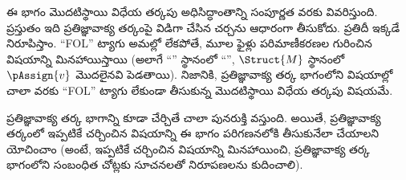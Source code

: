 \documentclass[../../include/open-logic-part]{subfiles}
\begin{document}

\begin{editorial}
  ఈ భాగం మొదటిస్థాయి విధేయ తర్కపు అధిసిద్ధాంతాన్ని సంపూర్ణత వరకు
  వివరిస్తుంది. ప్రస్తుతం ఇది ప్రతిజ్ఞావాక్య తర్కంపై విడిగా చేసిన చర్చను
  ఆధారంగా తీసుకోదు. ప్రతిదీ ఇక్కడే నిరూపిస్తాం. ``FOL'' ట్యాగు
  అమల్లో లేకపోతే, మూల ఫైళ్లు పరిమాణీకరణల గురించిన విషయాన్ని
  మినహాయిస్తాయి (అలాగే ``'' స్థానంలో
  ``'', $\Struct{M}$ స్థానంలో~$\pAssign{v}$ మొదలైనవి
  పెడతాయి). నిజానికి, ప్రతిజ్ఞావాక్య తర్క భాగంలోని విషయాల్లో చాలా వరకు
  ``FOL'' ట్యాగు లేకుండా తీసుకున్న మొదటిస్థాయి విధేయ తర్కపు విషయమే.

  ప్రతిజ్ఞావాక్య తర్క భాగాన్ని కూడా చేర్చితే చాలా పునరుక్తి వస్తుంది. అయితే,
  ప్రతిజ్ఞావాక్య తర్కంలో ఇప్పటికే చర్చించిన విషయాన్ని ఈ భాగం పరిగణనలోకి
  తీసుకునేలా చేయాలని యోచించాం (అంటే, ఇప్పటికే చర్చించిన విషయాన్ని
  మినహాయించి, ప్రతిజ్ఞావాక్య తర్క భాగంలోని సంబంధిత చోట్లకు సూచనలతో
  నిరూపణలను కుదించాలి).
\end{editorial}












\OLEndPartHook
\end{document}
